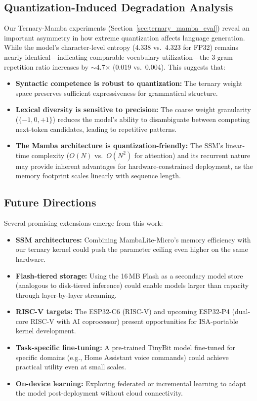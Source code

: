\subsection{Quantization-Induced Degradation Analysis}

Our Ternary-Mamba experiments (Section~\ref{sec:ternary_mamba_eval}) reveal an important asymmetry in how extreme quantization affects language generation. While the model's character-level entropy (4.338 vs.\ 4.323 for FP32) remains nearly identical---indicating comparable vocabulary utilization---the 3-gram repetition ratio increases by $\sim$4.7$\times$ (0.019 vs.\ 0.004). This suggests that:

\begin{itemize}[leftmargin=*,topsep=2pt,itemsep=1pt]
  \item \textbf{Syntactic competence is robust to quantization:} The ternary weight space preserves sufficient expressiveness for grammatical structure.
  \item \textbf{Lexical diversity is sensitive to precision:} The coarse weight granularity ($\{-1, 0, +1\}$) reduces the model's ability to disambiguate between competing next-token candidates, leading to repetitive patterns.
  \item \textbf{The Mamba architecture is quantization-friendly:} The SSM's linear-time complexity ($O(N)$ vs.\ $O(N^2)$ for attention) and its recurrent nature may provide inherent advantages for hardware-constrained deployment, as the memory footprint scales linearly with sequence length.
\end{itemize}

\subsection{Future Directions}

Several promising extensions emerge from this work:

\begin{itemize}[leftmargin=*,topsep=2pt,itemsep=1pt]
  \item \textbf{SSM architectures:} Combining MambaLite-Micro's memory
        efficiency with our ternary kernel could push the parameter
        ceiling even higher on the same hardware.
  \item \textbf{Flash-tiered storage:} Using the 16\,MB Flash as a
        secondary model store (analogous to disk-tiered inference)
        could enable models larger than \psram{} capacity through
        layer-by-layer streaming.
  \item \textbf{RISC-V targets:} The ESP32-C6 (RISC-V) and upcoming
        ESP32-P4 (dual-core RISC-V with AI coprocessor) present
        opportunities for ISA-portable kernel development.
  \item \textbf{Task-specific fine-tuning:} A pre-trained TinyBit model
        fine-tuned for specific domains (e.g., Home Assistant voice
        commands) could achieve practical utility even at small scales.
  \item \textbf{On-device learning:} Exploring federated or incremental
        learning to adapt the model post-deployment without cloud
        connectivity.
\end{itemize}
